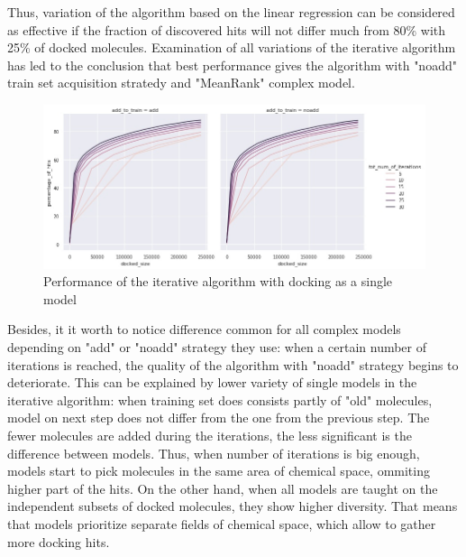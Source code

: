 Thus, variation of the algorithm based on the linear regression can be considered as effective if the fraction of discovered hits will not differ much from 80\% with 25\% of docked molecules. 
Examination of all variations of the iterative algorithm has led to the conclusion that best performance gives the algorithm with "noadd" train set acquisition stratedy and "MeanRank" complex model.\\

\begin{figure}[H]
    \centering
    \includegraphics[width = \linewidth]{Images/DockingIterations.jpg}
    \caption{Performance of the iterative algorithm with docking as a single model}
    \label{docking}
\end{figure}

Besides, it it worth to notice difference common for all complex models depending on "add" or "noadd" strategy they use: when a certain number of iterations is reached, the quality of the algorithm with "noadd" strategy begins to deteriorate.
This can be explained by lower variety of single models in the iterative algorithm: when training set does consists partly of "old" molecules, model on next step does not differ from the one from the previous step.
The fewer molecules are added during the iterations, the less significant is the difference between models.
Thus, when number of iterations is big enough, models start to pick molecules in the same area of chemical space, ommiting higher part of the hits.
On the other hand, when all models are taught on the independent subsets of docked molecules, they show higher diversity.
That means that models prioritize separate fields of chemical space, which allow to gather more docking hits.\\
\hfill\break
